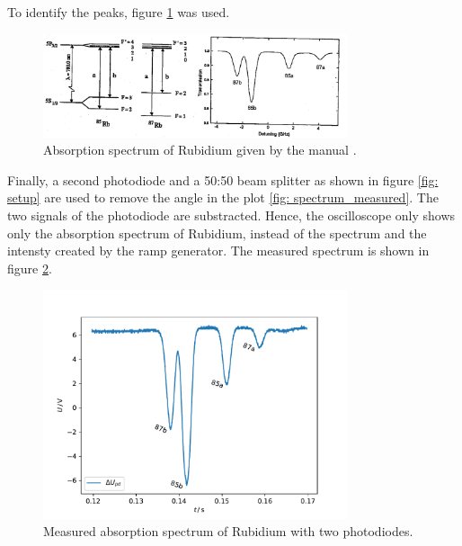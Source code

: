 To identify the peaks, figure \ref{fig: spectrum_manual} was used.
\begin{figure}
  \centering
  \includegraphics[width = 0.8\textwidth]{./content/images/absorption_spectrum_rubidium.png}
  \caption{Absorption spectrum of Rubidium given by the manual \cite{anleitung60}.}
  \label{fig: spectrum_manual}
\end{figure}
Finally, a second photodiode and a 50:50 beam splitter as shown in figure \ref{fig: setup}
are used to remove the angle in the plot \ref{fig: spectrum_measured}. The two signals of
the photodiode are substracted. Hence, the oscilloscope only shows only the
absorption spectrum of Rubidium, instead of the spectrum and the intensty created by the
ramp generator. The measured spectrum is shown in figure \ref{fig: spectrum_measured_straight}.
\begin{figure}
  \centering
  \includegraphics[width = 0.8\textwidth]{../analysis/plots/spectrum_straight.pdf}
  \caption{Measured absorption spectrum of Rubidium with two photodiodes.}
  \label{fig: spectrum_measured_straight}
\end{figure}

